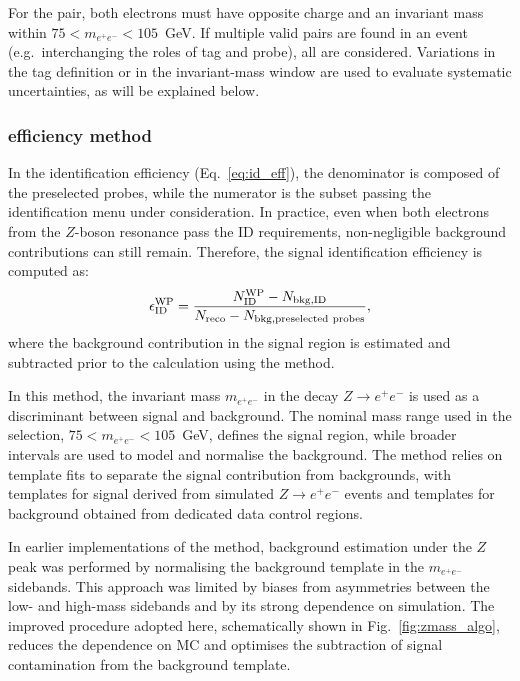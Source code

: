 For the \tp pair, both electrons must have opposite charge and an invariant mass within $75 < m_{e^+e^-} < 105$~GeV. If multiple valid pairs are found in an event (e.g.\ interchanging the roles of tag and probe), all are considered. 
Variations in the tag definition or in the invariant-mass window are used to evaluate systematic uncertainties, as will be explained below.


\subsubsection{\zmass efficiency method}
\label{method_itself}

In the identification efficiency (Eq.~\ref{eq:id_eff}), the denominator is composed of the preselected probes, while the numerator is the subset passing the identification menu under consideration. In practice, even when both electrons from the $Z$-boson resonance pass the ID requirements, non-negligible background contributions can still remain. Therefore, the signal identification efficiency is computed as:
\begin{equation}
  \small 
  \epsilon^{\text{WP}}_{\mathrm{ID}} = \frac{N^{\mathrm{WP}}_{\mathrm{ID}} - N_{\mathrm{bkg,ID}}}{N_{\mathrm{reco}} - N_{\mathrm{bkg,preselected\ probes}}},
\label{eq:id_eff}  
\end{equation}
where the background contribution in the signal region is estimated and subtracted prior to the calculation using the \zmass method.

In this method, the invariant mass $m_{e^+e^-}$ in the decay $Z\rightarrow e^+e^-$ is used as a discriminant between signal and background. The nominal mass range used in the selection, $75 < m_{e^+e^-} < 105$~GeV, defines the signal region, while broader intervals are used to model and normalise the background. The method relies on template fits to separate the signal contribution from backgrounds, with templates for signal derived from simulated $Z\rightarrow e^+e^-$ events and templates for background obtained from dedicated data control regions.

In earlier implementations of the \zmass method, background estimation under the $Z$ peak was performed by normalising the background template in the $m_{e^+e^-}$ sidebands. This approach was limited by biases from asymmetries between the low- and high-mass sidebands and by its strong dependence on simulation. The improved procedure adopted here, schematically shown in Fig.~\ref{fig:zmass_algo}, reduces the dependence on MC and optimises the subtraction of signal contamination from the background template.

